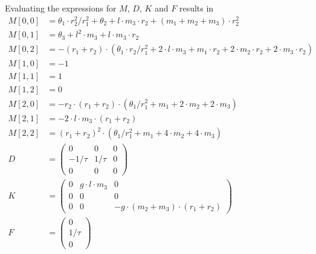\documentclass{article}
\begin{document}
Evaluating the expressions for $M$, $D$, $K$ and $F$ results in
\begin{align*}
M[0,0] &= \theta_1 \cdot r_2^2/r_1^2 + \theta_2 + l \cdot m_3 \cdot r_2 + (m_1 + m_2 + m_3) \cdot r_2^2  \\
M[0,1] &= \theta_3 + l^2 \cdot m_3 + l \cdot m_3 \cdot r_2  \\
M[0,2] &= -(r_1 + r_2) \cdot (\theta_1 \cdot r_2 /r_1^2 + 2 \cdot l \cdot m_3 + m_1 \cdot r_2 + 2 \cdot m_2 \cdot r_2 + 2 \cdot m_3 \cdot r_2)  \\
M[1,0] &= -1 \\
M[1,1] &= 1 \\
M[1,2] &= 0 \\
M[2,0] &= -r_2 \cdot (r_1 + r_2) \cdot (\theta_1/r_1^2  + m_1 + 2 \cdot m_2 + 2 \cdot m_3) \\
M[2,1] &= -2 \cdot l \cdot m_3 \cdot (r_1 + r_2) \\
M[2,2] &= (r_1 + r_2)^2 \cdot (\theta_1/r_1^2 + m_1 + 4 \cdot m_2 + 4 \cdot m_3) \\
D &= \left( {\begin{array}{ccc}
0 & 0 & 0 \\
-1/\tau & 1/\tau & 0 \\
0 & 0 & 0 \end{array} } \right) \\
K &= \left( {\begin{array}{ccc}
0 & g \cdot l \cdot m_3 & 0 \\
0 & 0 & 0 \\
0 & 0 & -g \cdot (m_2 + m_3) \cdot (r_1 + r_2)  \end{array} } \right) \\
F &= \left( {\begin{array}{c} 0 \\ 1/\tau \\ 0 \end{array} } \right)
\end{align*}
\end{document}
